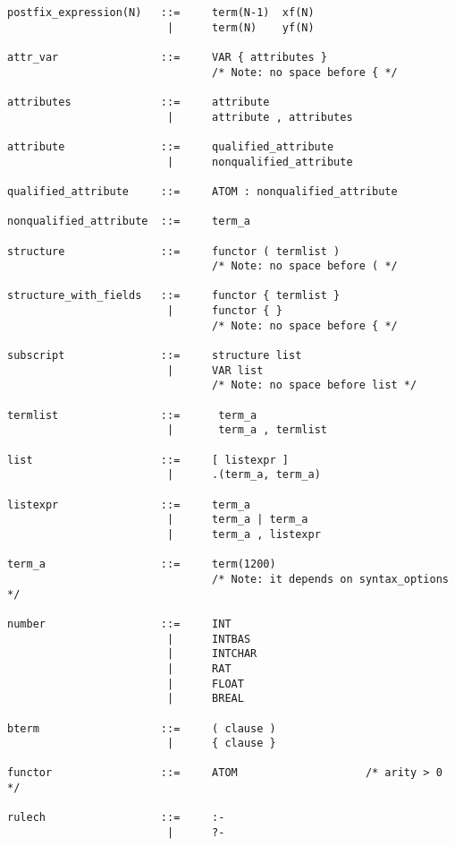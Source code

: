 \begin{verbatim}
postfix_expression(N)   ::=     term(N-1)  xf(N)
                         |      term(N)    yf(N)

attr_var                ::=     VAR { attributes }
                                /* Note: no space before { */

attributes              ::=     attribute
                         |      attribute , attributes

attribute               ::=     qualified_attribute
                         |      nonqualified_attribute

qualified_attribute     ::=     ATOM : nonqualified_attribute

nonqualified_attribute  ::=     term_a

structure               ::=     functor ( termlist )
                                /* Note: no space before ( */

structure_with_fields   ::=     functor { termlist }
                         |      functor { }
                                /* Note: no space before { */

subscript               ::=     structure list
                         |      VAR list
                                /* Note: no space before list */

termlist                ::=      term_a
                         |       term_a , termlist

list                    ::=     [ listexpr ]
                         |      .(term_a, term_a)

listexpr                ::=     term_a
                         |      term_a | term_a
                         |      term_a , listexpr

term_a                  ::=     term(1200)
                                /* Note: it depends on syntax_options */

number                  ::=     INT
                         |      INTBAS
                         |      INTCHAR
                         |      RAT
                         |      FLOAT
                         |      BREAL

bterm                   ::=     ( clause )
                         |      { clause }

functor                 ::=     ATOM                    /* arity > 0 */

rulech                  ::=     :-
                         |      ?-
\end{verbatim}



